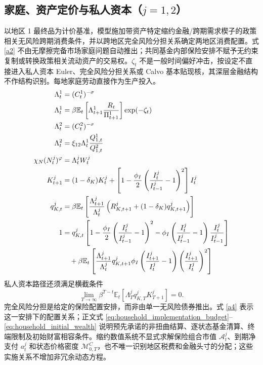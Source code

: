 \documentclass[12pt,UTF8]{ctexart}
\newcommand{\E}{\mathbb{E}}
\begin{document}
	\subsection{家庭、资产定价与私人资本（\texorpdfstring{$j=1,2$}{j=1,2}）}
	以地区 1 最终品为计价基准，模型施加带资产特定缩约金融/跨期需求楔子的政策相关无风险跨期消费条件，并以跨地区完全风险分担关系确定两地区消费配置。式 \eqref{a2} 不由无摩擦完备市场家庭问题自动推出；共同基金内部保险安排不赋予无约束复制或转换政策相关流动资产的交易权。$\zeta_t$ 不是一般时间偏好冲击，按设定不直接进入私人资本 Euler、完全风险分担关系或 Calvo 基本贴现核，其深层金融结构不作结构识别。每地家庭劳动直接作为生产投入。
	\begin{align}
		\Lambda_{t}^1 &=(C_{t}^1)^{-\sigma} \label{a1}\\
		\Lambda_{t}^1 &=\beta \E_t\left[\Lambda_{t+1}^1\frac{R_t}{\Pi_{t+1}^1}\right]\exp(-\zeta_t) \label{a2}\\
		\Lambda_{t}^2 &=(C_{t}^2)^{-\sigma} \label{a3}\\
		\Lambda_{t}^2 &=\xi_{12}\Lambda_{t}^1\frac{Q_{1,t}^1}{Q_{1,t}^2} \label{a4}\\
		\chi_N(N_{t}^j)^{\varphi} &=\Lambda_{t}^jW_t^j \label{a5}\\
		K_{t+1}^j &=(1-\delta_K)K_t^j+ \left[1-\frac{\phi_I}{2}\left(\frac{I_t^j}{I_{t-1}^j}-1\right)^2\right]I_t^j \label{a10}\\
		q_{K,t}^j
		&=\beta \E_t\left[
		\frac{\Lambda_{t+1}^j}{\Lambda_{t}^j}
		\left(R_{K,t+1}^j+(1-\delta_K)q_{K,t+1}^j\right)
		\right] \label{a11}\\
		1
		&=q_{K,t}^j
		\left[
		1-\frac{\phi_I}{2}\left(\frac{I_t^j}{I_{t-1}^j}-1\right)^2
		-\phi_I\left(\frac{I_t^j}{I_{t-1}^j}-1\right)\frac{I_t^j}{I_{t-1}^j}
		\right] \notag\\
		&\quad+\beta \E_t\left[
		\frac{\Lambda_{t+1}^j}{\Lambda_{t}^j}
		q_{K,t+1}^j
		\phi_I\left(\frac{I_{t+1}^j}{I_t^j}-1\right)
		\left(\frac{I_{t+1}^j}{I_t^j}\right)^2
		\right] \label{a12}
	\end{align}
	私人资本路径还须满足横截条件
	\begin{equation}
		\lim_{T\to\infty}\beta^{T-t}\E_t\left[
		\Lambda_{T}^j q_{K,T}^jK_{T+1}^j
		\right]=0. \label{a12tvc}
	\end{equation}
	完全风险分担是给定的保险配置安排，而非由单一无风险债券推出。式 \eqref{a4} 表示这一安排下的配置关系；正文式 \eqref{eq:household_implementation_budget}--\eqref{eq:household_initial_wealth} 说明预先承诺的非扭曲结算、逐状态基金清算、终端限制及初始财富相容条件。缩约数值系统不显式求解保险组合市值 $\mathcal A_t^j$、到期净支付 $a_t^j$ 和状态价格密度 $\mathcal M_{0,T}^{C}$，也不唯一识别地区税费和金融头寸的分配；这些实施关系不增加非冗余动态方程。
	
\end{document}
